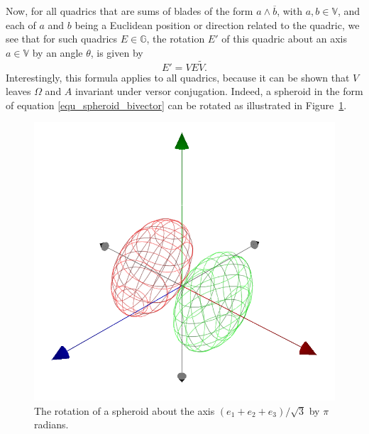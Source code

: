 \documentclass{birkjour}
\theoremstyle{definition}
\theoremstyle{remark}
\numberwithin{equation}{section}
\newcommand{\G}{\mathbb{G}}
\newcommand{\V}{\mathbb{V}}
\begin{document}
Now, for all quadrics
that are sums of blades of the form $a\wedge\overline{b}$, with $a,b\in\V$,
and each of $a$ and $b$ being a Euclidean position or direction related to the quadric,
we see that for such quadrics $E\in\G$, the rotation $E'$ of this quadric
about an axis $a\in\V$ by an angle $\theta$, is given by
\begin{equation}
E' = VE\tilde{V}.
\end{equation}
Interestingly, this formula applies to all quadrics, because it can be shown
that $V$ leaves $\Omega$ and $A$ invariant under versor conjugation.
Indeed, a spheroid in the form of equation \eqref{equ_spheroid_bivector}
can be rotated as illustrated in Figure~\ref{fig_rot_spheroid}.
\begin{figure}
\includegraphics[scale=0.5]{RotatedSpheroid}
\caption{The rotation of a spheroid about the axis $(e_1+e_2+e_3)/\sqrt{3}$ by $\pi$ radians.}
\label{fig_rot_spheroid}
\end{figure}
\end{document}
